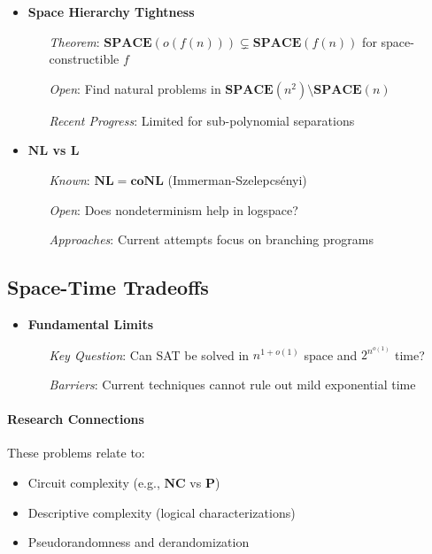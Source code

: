 \begin{itemize}
    \item \textbf{Space Hierarchy Tightness}
    \begin{itemize}
        \item[\textit{Theorem}:] $\mathbf{SPACE}(o(f(n))) \subsetneq \mathbf{SPACE}(f(n))$ for space-constructible $f$
        \item[\textit{Open}:] Find natural problems in $\mathbf{SPACE}(n^2) \setminus \mathbf{SPACE}(n)$
        \item[\textit{Recent Progress}:] Limited for sub-polynomial separations
    \end{itemize}

    \item \textbf{$\mathbf{NL}$ vs $\mathbf{L}$}
    \begin{itemize}
        \item[\textit{Known}:] $\mathbf{NL} = \mathbf{coNL}$ (Immerman-Szelepcsényi)
        \item[\textit{Open}:] Does nondeterminism help in logspace?
        \item[\textit{Approaches}:] Current attempts focus on branching programs
    \end{itemize}
\end{itemize}

\subsection{Space-Time Tradeoffs}

\begin{itemize}
    \item \textbf{Fundamental Limits}
    \begin{itemize}
        \item[\textit{Key Question}:] Can SAT be solved in $n^{1+o(1)}$ space and $2^{n^{o(1)}}$ time?
        \item[\textit{Barriers}:] Current techniques cannot rule out mild exponential time
    \end{itemize}
\end{itemize}

\paragraph{Research Connections} These problems relate to:
\begin{itemize}
    \item Circuit complexity (e.g., $\mathbf{NC}$ vs $\mathbf{P}$)
    \item Descriptive complexity (logical characterizations)
    \item Pseudorandomness and derandomization
\end{itemize}
